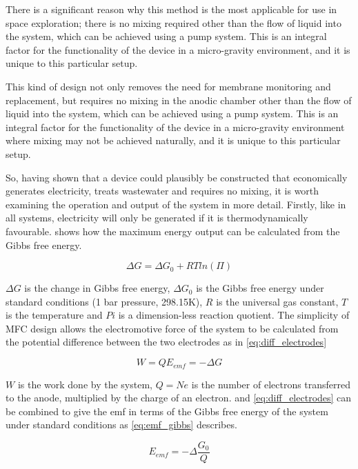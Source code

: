 \documentclass[12pt]{article}
\begin{document}
There is a significant reason why this method is the most applicable for use in space exploration; there is no mixing required other than the flow of liquid into the system, which can be achieved using a pump system. This is an integral factor for the functionality of the device in a micro-gravity environment, and it is unique to this particular setup. \cite{min2004continuous}

This kind of design not only removes the need for membrane monitoring and replacement, but requires no mixing in the anodic chamber other than the flow of liquid into the system, which can be achieved using a pump system. This is an integral factor for the functionality of the device in a micro-gravity environment where mixing may not be achieved naturally, and it is unique to this particular setup.\cite{min2004continuous}

So, having shown that a device could plausibly be constructed that economically generates electricity, treats wastewater and requires no mixing, it is worth examining the operation and output of the system in more detail. Firstly, like in all systems, electricity will only be generated if it is thermodynamically favourable.  shows how the maximum energy output can be calculated from the Gibbs free energy.

\begin{equation}
\Delta G = \Delta G_{0} + RT ln(\Pi)
\label{eq:gfree}
\end{equation}

$\Delta G$ is the change in Gibbs free energy, $\Delta G_{0}$ is the Gibbs free energy under standard conditions (1 bar pressure, 298.15K), $R$ is the universal gas constant, $T$ is the temperature and $Pi$ is a dimension-less reaction quotient. The simplicity of MFC design allows the electromotive force of the system to be calculated from the potential difference between the two electrodes as in \cref{eq:diff_electrodes}

\begin{equation}
W=Q E_{emf} = -\Delta G
\label{eq:diff_electrodes}
\end{equation}

$W$ is the work done by the system, $Q = Ne$ is the number of electrons transferred to the anode, multiplied by the charge of an electron.  and \cref{eq:diff_electrodes} can be combined to give the emf in terms of the Gibbs free energy of the system under standard conditions as \cref{eq:emf_gibbs} describes.

\begin{equation}
E_{emf} = - \Delta \frac{G_{0}}{Q}
\label{eq:emf_gibbs}
\end{equation}
\end{document}
